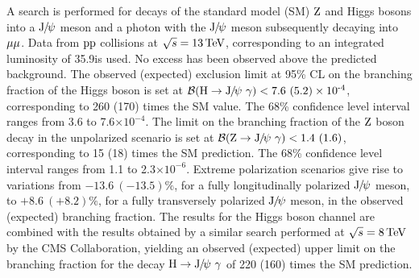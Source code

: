 A search is performed for decays of the standard model (SM) $\mathrm{Z}$ and Higgs bosons into a ${\mathrm{J}\hspace{-.08em}/\hspace{-.14em}\psi}$ meson and a photon with the ${\mathrm{J}\hspace{-.08em}/\hspace{-.14em}\psi}$ meson subsequently decaying into $\mu\mu$. 
Data from $\mathrm{p}\mathrm{p}$ collisions at $\sqrt{s}=13\,\text{Te\hspace{-.08em}V}$, corresponding to an integrated luminosity of 35.9\fbinv is used.
No excess has been observed above the predicted background. 
The observed (expected) exclusion limit at 95\% CL on the branching fraction of the Higgs boson is set at $\mathcal{B}(\PH\to\JPsi\ \gamma)<7.6\ (5.2)\ten{-4}$, corresponding to 260 (170) times the SM value. The 68\% confidence level interval ranges from 3.6 to 7.6$\times 10^{-4}$.
The limit on the branching fraction of the $\mathrm{Z}$ boson decay in the unpolarized scenario is set at $\mathcal{B}(\cPZ\to\JPsi\ \gamma) < 1.4\ (1.6)$, corresponding to 15 (18) times the SM prediction. The 68\% confidence level interval ranges from 1.1 to 2.3$\times 10^{-6}$.
Extreme polarization scenarios give rise to variations from $-13.6\ (-13.5)\%$, for a fully longitudinally polarized ${\mathrm{J}\hspace{-.08em}/\hspace{-.14em}\psi}$ meson, to $+8.6\ (+8.2)\%$, for a fully transversely polarized ${\mathrm{J}\hspace{-.08em}/\hspace{-.14em}\psi}$ meson, in the observed (expected) branching fraction. 
The results for the Higgs boson channel are combined with the results obtained by a similar search performed at $\sqrt{s}=8\,\text{Te\hspace{-.08em}V}$ by the CMS Collaboration, yielding an observed (expected) upper limit on the branching fraction for the decay $\mathrm{H}\to{\mathrm{J}\hspace{-.08em}/\hspace{-.14em}\psi}\ \gamma$ of 220 (160) times the SM prediction.

